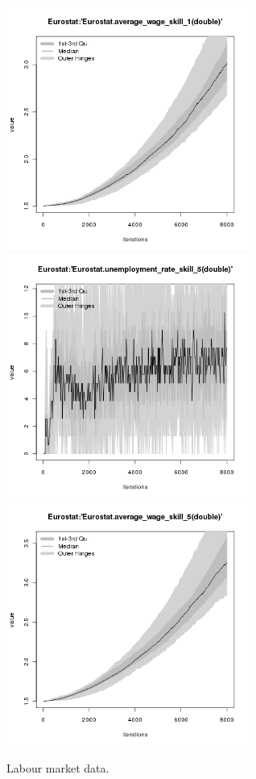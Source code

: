 \begin{figure}[H!]
\begin{minipage}{17cm}
\includegraphics[width=8cm]{./benchmark_plots/Eurostat-average_wage_skill_1.png}\\
\includegraphics[width=8cm]{./benchmark_plots/Eurostat-unemployment_rate_skill_5.png}
\includegraphics[width=8cm]{./benchmark_plots/Eurostat-average_wage_skill_5.png}
\end{minipage}
\caption{Labour market data.}
\label{Figure: Labour Market}
\end{figure}


